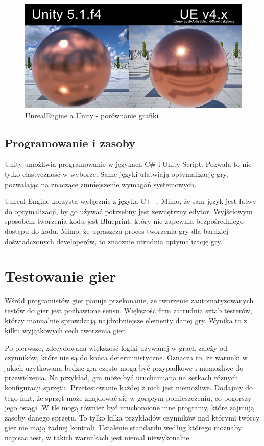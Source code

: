 \documentclass[openright]{xmgr}
\begin{document}
\begin{figure}[!htb]
    \begin{center}
    \includegraphics[scale=0.5]{Screeny/UE_vs_Unity}
    \end{center}
    \caption{UnrealEngine a Unity - porównanie grafiki}
\end{figure}

\section{Programowanie i zasoby}

Unity umożliwia programowanie w językach C\# i Unity Script. Pozwala to nie tylko elastyczność w wyborze. Same języki ułatwiają optymalizację gry, pozwalając na znaczące zmniejszenie wymagań systemowych.

Unreal Engine korzysta wyłącznie z języka C++. Mimo, że sam język jest łatwy do optymalizacji, by go używać potrzebny jest zewnętrzny edytor. Wyjściowym sposobem tworzenia kodu jest Blueprint, który nie zapewnia bezpośredniego dostępu do kodu. Mimo, że upraszcza proces tworzenia gry dla bardziej doświadczonych developerów, to znacznie utrudnia optymalizację gry.

\chapter{ Testowanie gier}

Wśród programistów gier panuje przekonanie, że tworzenie zautomatyzowanych testów do gier jest pozbawione sensu. Większość firm zatrudnia sztab testerów, którzy manualnie sprawdzają najdrobniejsze elementy danej gry. Wynika to z kilku wyjątkowych cech tworzenia gier.

Po pierwsze, zdecydowana większość logiki używanej w grach zależy od czynników, które nie są do końca deterministyczne. Oznacza to, że warunki w jakich użytkowana będzie gra często mogą być przypadkowe i niemożliwe do przewidzenia. Na przykład, gra może być uruchamiana na setkach różnych konfiguracji sprzętu. Przetestowanie każdej z nich jest niemożliwe. Dodajmy do tego fakt, że sprzęt może znajdować się w gorącym pomieszczeniu, co pogorszy jego osiągi. W tle mogą również być uruchomione inne programy, które zajmują zasoby danego sprzętu. To tylko kilka przykładów czynników nad którymi twórcy gier nie mają żadnej kontroli. Ustalenie standardu według którego możnaby napisac test, w takich warunkach jest niemal niewykonalne.
\end{document}
